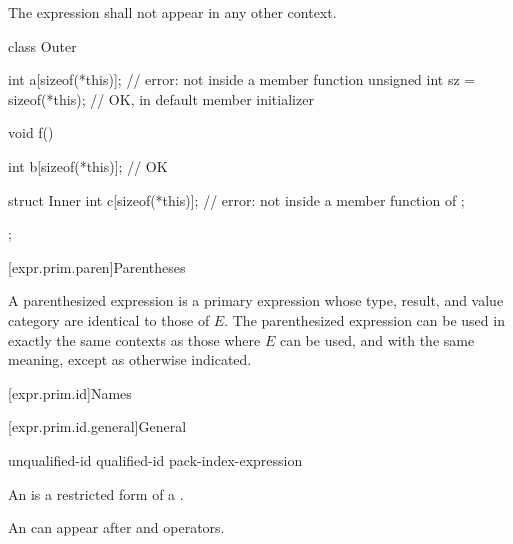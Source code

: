 \pnum
The expression  shall not appear in any other context.
\begin{example}
\begin{codeblock}
class Outer {
  int a[sizeof(*this)];                 // error: not inside a member function
  unsigned int sz = sizeof(*this);      // OK, in default member initializer

  void f() {
    int b[sizeof(*this)];               // OK

    struct Inner {
      int c[sizeof(*this)];             // error: not inside a member function of 
    };
  }
};
\end{codeblock}
\end{example}

[expr.prim.paren]{Parentheses}

\pnum
{}%
A parenthesized expression 
is a primary expression whose type, result, and value category are identical to those of $E$.
The parenthesized expression can be used in exactly the same contexts as
those where $E$ can be used, and with the same
meaning, except as otherwise indicated.

[expr.prim.id]{Names}

[expr.prim.id.general]{General}

\begin{bnf}
\br
    unqualified-id\br
    qualified-id\br
    pack-index-expression
\end{bnf}

\pnum
{}%
An  is a restricted form of a
.
\begin{note}
An  can appear after  and \tcode{->}
operators.
\end{note}

